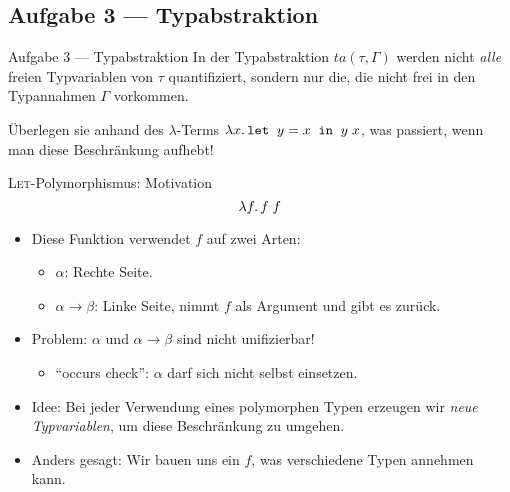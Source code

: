 \documentclass{beamer}
\begin{document}
\subsection{Aufgabe 3 --- Typabstraktion}

\begin{frame}{Aufgabe 3 --- Typabstraktion}
  In der Typabstraktion $ta(\tau, \Gamma)$ werden nicht \emph{alle} freien Typvariablen von $\tau$ quantifiziert, sondern nur die, die nicht frei in den Typannahmen $\Gamma$ vorkommen.

  Überlegen sie anhand des $\lambda$-Terms $\lambda x.\, \texttt{let} \;\; y = x \;\; \texttt{in} \;\; y\;x$, was passiert, wenn man diese Beschränkung aufhebt!
\end{frame}

\begin{frame}{\textsc{Let}-Polymorphismus: Motivation}
  \begin{equation*}
    \lambda f.\, f\;f
  \end{equation*}

  \begin{itemize}
    \item Diese Funktion verwendet $f$ auf zwei Arten:
    \begin{itemize}
      \item $\alpha$: Rechte Seite.
      \item $\alpha \to \beta$: Linke Seite, nimmt $f$ als Argument und gibt es zurück.
    \end{itemize}
    \pause
    \item Problem: $\alpha$ und $\alpha \to \beta$ sind nicht unifizierbar!
    \begin{itemize}
      \item \enquote{occurs check}: $\alpha$ darf sich nicht selbst einsetzen.
    \end{itemize}
  \item Idee: Bei jeder Verwendung eines polymorphen Typen erzeugen wir \emph{neue Typvariablen}, um diese Beschränkung zu umgehen.
  \item Anders gesagt: Wir bauen uns ein $f$, was verschiedene Typen annehmen kann.
  \end{itemize}
\end{frame}
\end{document}
